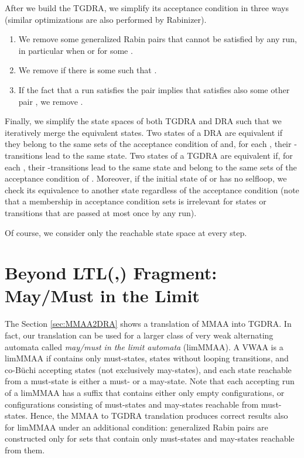 \documentclass{llncs}
\begin{document}
After we build the TGDRA, we simplify its acceptance condition in three
ways (similar optimizations are also performed by Rabinizer).
\begin{enumerate}
\item We remove some generalized Rabin pairs 
  that cannot be satisfied by any run, in particular when  or  for some .
\item We remove  if there is some  such that .
\item If the fact that a run  satisfies the pair  implies that
   satisfies also some other pair , we remove .
\end{enumerate}

Finally, we simplify the state spaces of both TGDRA and DRA such that we
iteratively merge the equivalent states. Two states of a DRA  are
equivalent if they belong to the same sets of the acceptance condition of
 and, for each , their -transitions lead to the same
state. Two states of a TGDRA  are equivalent if, for each ,
their -transitions lead to the same state and belong to the same
sets of the acceptance condition of . Moreover, if the initial state of
 or  has no selfloop, we check its equivalence to another state
regardless of the acceptance condition (note that a membership in acceptance
condition sets is irrelevant for states or transitions that are passed at
most once by any run).



Of course, we consider only the reachable state space at every step.



\section{Beyond LTL(,) Fragment: May/Must in the Limit}
\label{sec:limmmaa}

The Section \ref{sec:MMAA2DRA} shows a translation of MMAA into TGDRA.  In
fact, our translation can be used for a larger class of very weak
alternating automata called \emph{may/must in the limit automata} (limMMAA).
A VWAA  is a limMMAA if  contains only must-states, states without
looping transitions, and co-B\"{u}chi accepting states (not exclusively
may-states), and each state reachable from a must-state is either a must- 
or a may-state. Note that each accepting run of a limMMAA has a suffix that
contains either only empty configurations, or configurations consisting of
must-states and may-states reachable from must-states. Hence, the MMAA to
TGDRA translation produces correct results also for limMMAA under an
additional
condition: generalized Rabin pairs  are constructed only for sets
 that contain only must-states and may-states reachable from them.
\end{document}
